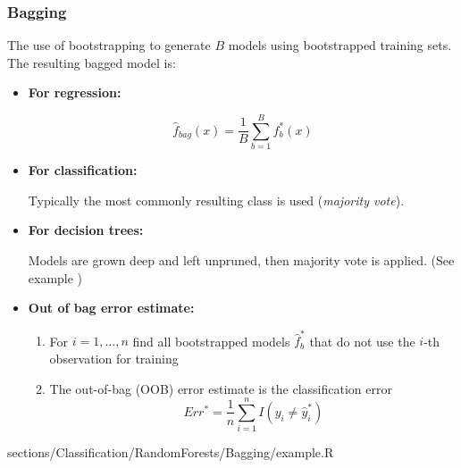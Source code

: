     \subsubsection{Bagging}
	 	\RTheory
	 	{
	 		The use of bootstrapping to generate $B$ models using bootstrapped training sets. The resulting bagged model is:
	 		
	 		\begin{itemize}
	 		    \item \textbf{For regression:}
	 		    
	 		    	$$ \hat{f}_{bag}(x) = \frac{1}{B} \sum\limits_{b=1}^B f_b^*(x)$$
	 		    	
	 		  	\item \textbf{For classification:}
	 		  	
					Typically the most commonly resulting class is used (\emph{majority vote}).
	 		  	
	 		  	\item \textbf{For decision trees:}
	 		  	
	 	    		Models are grown deep and left unpruned, then majority vote is applied. (See example \textrightarrow)
	 	    		
	 	    	\item \textbf{Out of bag error estimate:}
	 	    	
			 	    \begin{enumerate}
			 	        \item For $i = 1,\dots, n$ find all bootstrapped models $\hat{f}_b^*$ that do not use the $i$-th observation for training
			 	        \item The out-of-bag (OOB) error estimate is the classification error
			 	        	$$Err^* = \frac{1}{n} \sum\limits_{i=1}^nI(y_i \neq \hat{y}_i^*)$$ 
			 	    \end{enumerate}
	 		\end{itemize}
	 		
	 		
	 	    
	 	    
	 	    
	 	    
	 	    
	 	    
    	}
    	{
    		sections/Classification/RandomForests/Bagging/example.R
    	}		